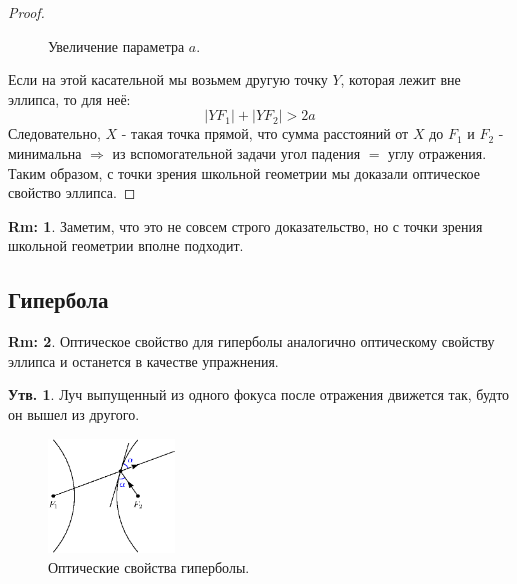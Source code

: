 \documentclass[12pt]{article}
\theoremstyle{definition}
\newtheorem{rem}{Rm:}
\newtheorem{prop}{Утв.}
\begin{document}
\begin{proof}
\begin{figure}[H]
		\caption{Увеличение параметра $a$.}
		\label{2_9}
	\end{figure}
	Если на этой касательной мы возьмем другую точку $Y$, которая лежит вне эллипса, то для неё:
	$$
		|YF_1| + |YF_2| > 2a
	$$
	Следовательно, $X$ - такая точка прямой, что сумма расстояний от $X$ до $F_1$ и $F_2$ - минимальна $\Rightarrow$ из вспомогательной задачи угол падения $=$ углу отражения. Таким образом, с точки зрения школьной геометрии мы доказали оптическое свойство эллипса.
	
\end{proof}

\begin{rem}
	Заметим, что это не совсем строго доказательство, но с точки зрения школьной геометрии вполне подходит.
\end{rem}

\subsection*{Гипербола}
\begin{rem}
	Оптическое свойство для гиперболы аналогично оптическому свойству эллипса и останется в качестве упражнения.
\end{rem}

\begin{prop}
	Луч выпущенный из одного фокуса после отражения движется так, будто он вышел из другого.
\end{prop}

\begin{figure}[H]
	\centering
	\includegraphics[width=0.3\textwidth]{ANGL2_10.eps}
	\caption{Оптические свойства гиперболы.}
	\label{2_10}
\end{figure}
\end{document}
